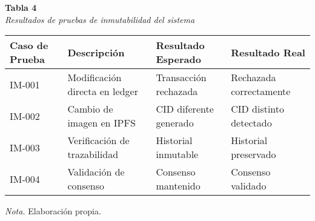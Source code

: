 \begin{table}[htbp]
    \begin{flushleft}
        \textbf{Tabla 4}\\[1em]
        \textit{Resultados de pruebas de inmutabilidad del sistema}
    \end{flushleft}
    \vspace{1em}
    \centering
    \begin{tabular}{p{3cm} p{4cm} p{3cm} p{3cm}}
        \toprule
        \textbf{Caso de Prueba} & \textbf{Descripción} & \textbf{Resultado Esperado} & \textbf{Resultado Real} \\
        \midrule
        IM-001 & Modificación directa en ledger & Transacción rechazada & Rechazada correctamente \\
        IM-002 & Cambio de imagen en IPFS & CID diferente generado & CID distinto detectado \\
        IM-003 & Verificación de trazabilidad & Historial inmutable & Historial preservado \\
        IM-004 & Validación de consenso & Consenso mantenido & Consenso validado \\
        \bottomrule
    \end{tabular}
    \vspace{1em}
    \begin{flushleft}
        \textit{Nota.} Elaboración propia.
    \end{flushleft}
    \label{tab:resultados_inmutabilidad}
\end{table} 